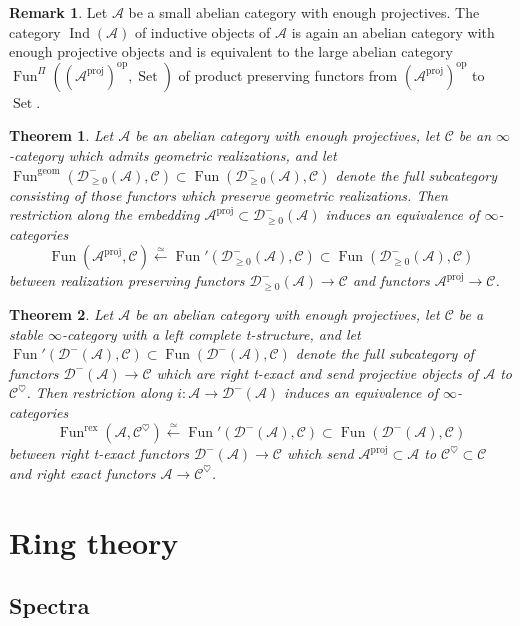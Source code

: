 \documentclass[12pt]{article}
\newtheorem{theorem}{Theorem}[subsection]
\theoremstyle{definition}
\newtheorem{remark}{Remark}[subsection]
\newcommand{\A}{\mathcal{A}}
\newcommand{\C}{\mathcal{C}}
\newcommand{\D}{\mathcal{D}}
\renewcommand{\i}{\infty}
\newcommand{\from}{\longleftarrow}
\newcommand{\op}{\mathrm{op}}
\DeclareMathOperator{\Fun}{Fun}
\DeclareMathOperator{\proj}{proj}
\DeclareMathOperator{\Set}{Set}
\DeclareMathOperator{\Ind}{Ind}
\begin{document}
\begin{remark}
Let $\A$ be a small abelian category with enough projectives.
The category $\Ind(\A)$ of inductive objects of $\A$ is again an abelian category with enough projective objects and is equivalent to the large abelian category $\Fun^{\Pi}((\A^{\proj})^{\op},\Set)$ of product preserving functors from $(\A^{\proj})^{\op}$ to $\Set$.
\end{remark}

\begin{theorem}{\em \cite[Theorem 1.3.3.8]{HA}}
Let $\A$ be an abelian category with enough projectives, let $\C$ be an $\i$-category which admits geometric realizations, and let $\Fun^\mathrm{geom}(\D^-_{\geq 0}(\A),\C)\subset\Fun(\D^-_{\geq 0}(\A),\C)$ denote the full subcategory consisting of those functors which preserve geometric realizations.
Then restriction along the embedding $\A^{\proj}\subset\D_{\geq 0}^-(\A)$ induces an equivalence of $\i$-categories
\[
\Fun(\A^{\proj},\C)\overset{\simeq}{\from}\Fun'(\D^-_{\geq 0}(\A),\C)\subset\Fun(\D^-_{\geq 0}(\A),\C)
\]
between realization preserving functors $\D^-_{\geq 0}(\A)\to\C$ and functors $\A^{\proj}\to\C$.
\end{theorem}
\begin{theorem}{\em \cite[Theorem HA.1.3.3.2]{HA}}
Let $\A$ be an abelian category with enough projectives, let $\C$ be a stable $\infty$-category with a left complete t-structure, and let $\Fun'(\D^-(\A),\C)\subset\Fun(\D^-(\A),\C)$ denote the full subcategory of functors $\D^-(\A)\to\C$ which are right t-exact and send projective objects of $\A$ to $\C^\heartsuit$.
Then restriction along $i:\A\to\D^-(\A)$ induces an equivalence of $\i$-categories
\[
\Fun^\mathrm{rex}(\A,\C^\heartsuit)\overset{\simeq}{\from}\Fun'(\D^-(\A),\C)\subset\Fun(\D^-(\A),\C)
\]
between right t-exact functors $\D^-(\A)\to\C$ which send $\A^{\proj}\subset\A$ to $\C^\heartsuit\subset\C$ and right exact functors $\A\to\C^\heartsuit$.
\end{theorem}




\section{Ring theory}\label{sec:rt}




\subsection{Spectra}
\end{document}
